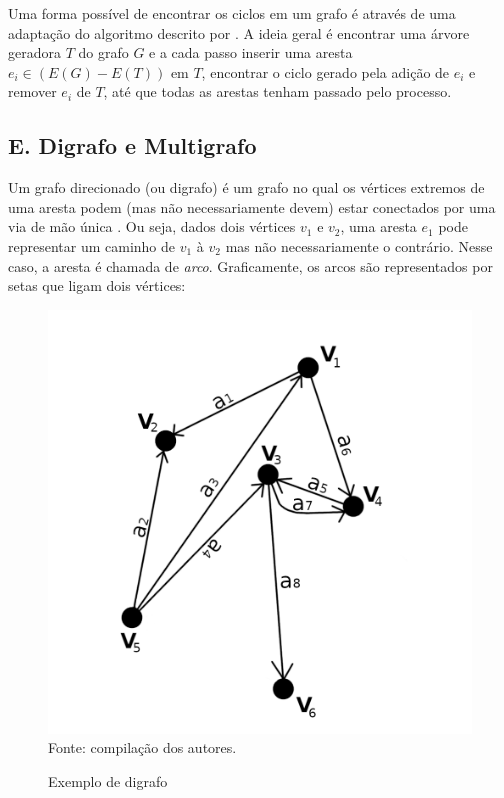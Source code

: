 \documentclass[twocolumn, 10pt]{extarticle}
\begin{document}
Uma forma possível de encontrar os ciclos em um grafo é através de uma adaptação do algoritmo descrito por \cite{paton}. A ideia geral é encontrar uma árvore geradora $T$ do grafo $G$ e a cada passo inserir uma aresta $e_i \in (E(G)-E(T))$ em $T$, encontrar o ciclo gerado pela adição de $e_i$ e remover $e_i$ de $T$, até que todas as arestas tenham passado pelo processo.

\begingroup
{}\label{lp}
\begin{algorithmic}[1]
	\EndFor
\EndFunction
\end{algorithmic}
\hrulefill
\endgroup


\subsection*{E. \quad Digrafo e Multigrafo}

Um grafo direcionado (ou digrafo) é um grafo no qual os vértices extremos de uma aresta podem (mas não necessariamente devem) estar conectados por uma via de mão única \cite[p. 566]{sedgewick}. Ou seja, dados dois vértices $v_1$ e $v_2$, uma aresta $e_1$ pode representar um caminho de $v_1$ à $v_2$ mas não necessariamente o contrário. Nesse caso, a aresta é chamada de \textit{arco}. Graficamente, os arcos são representados por setas que ligam dois vértices:

\begin{figure}[H]
	\caption{Exemplo de digrafo} 
	\centering
	\includegraphics[scale=0.7]{digrafo1}
	\\ Fonte: compilação dos autores.
\end{figure}
\end{document}
